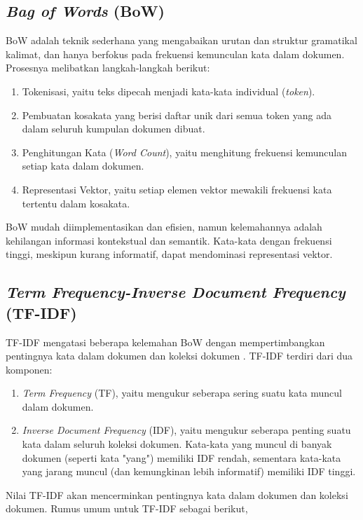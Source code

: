 \subsection{\textit{Bag of Words} (BoW)}
BoW adalah teknik sederhana yang mengabaikan urutan dan struktur gramatikal kalimat, dan hanya berfokus pada frekuensi kemunculan kata dalam dokumen. Prosesnya melibatkan langkah-langkah berikut:

\begin{enumerate}
    \item Tokenisasi, yaitu teks dipecah menjadi kata-kata individual (\textit{token}).
    \item Pembuatan kosakata yang berisi daftar unik dari semua token yang ada dalam seluruh kumpulan dokumen dibuat.
    \item Penghitungan Kata (\textit{Word Count}), yaitu menghitung frekuensi kemunculan setiap kata dalam dokumen.
    \item Representasi Vektor, yaitu setiap elemen vektor mewakili frekuensi kata tertentu dalam kosakata.
\end{enumerate}

BoW mudah diimplementasikan dan efisien, namun kelemahannya adalah kehilangan informasi kontekstual dan semantik. Kata-kata dengan frekuensi tinggi, meskipun kurang informatif, dapat mendominasi representasi vektor.

\subsection{\textit{Term Frequency-Inverse Document Frequency} (TF-IDF)}

TF-IDF mengatasi beberapa kelemahan BoW dengan mempertimbangkan pentingnya kata dalam dokumen dan koleksi dokumen \cite{qaiserTextMiningUse2018}. TF-IDF terdiri dari dua komponen:

\begin{enumerate}
    \item \textit{Term Frequency} (TF), yaitu mengukur seberapa sering suatu kata muncul dalam dokumen.
    \item \textit{Inverse Document Frequency} (IDF), yaitu mengukur seberapa penting suatu kata dalam seluruh koleksi dokumen. Kata-kata yang muncul di banyak dokumen (seperti kata "yang") memiliki IDF rendah, sementara kata-kata yang jarang muncul (dan kemungkinan lebih informatif) memiliki IDF tinggi.
\end{enumerate}

Nilai TF-IDF akan mencerminkan pentingnya kata dalam dokumen dan koleksi dokumen. Rumus umum untuk TF-IDF sebagai berikut, 

